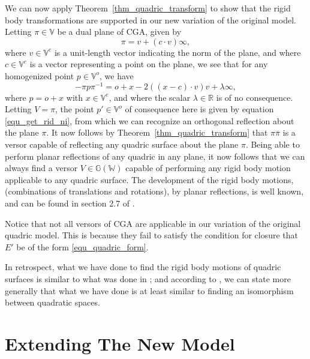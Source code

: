 \documentclass{birkjour}
\theoremstyle{definition}
\theoremstyle{remark}
\numberwithin{equation}{section}
\newcommand{\G}{\mathbb{G}}
\newcommand{\V}{\mathbb{V}}
\newcommand{\W}{\mathbb{W}}
\newcommand{\R}{\mathbb{R}}
\newcommand{\nvao}{o}
\newcommand{\nvai}{\infty}
\begin{document}
We can now apply Theorem~\ref{thm_quadric_transform} to show
that the rigid body transformations are supported in our new variation
of the original model.
Letting $\pi\in\V$ be a dual plane of CGA, given by
\begin{equation}
\pi = v+(c\cdot v)\nvai,
\end{equation}
where $v\in\V^e$ is a unit-length vector indicating the norm of the plane,
and where $c\in\V^e$ is a vector representing a point on the plane,
we see that for any homogenized point $p\in\V^o$, we have
\begin{equation}
-\pi p\pi^{-1} = \nvao+x-2((x-c)\cdot v)v + \lambda\nvai,
\end{equation}
where $p=\nvao+x$ with $x\in\V^e$, and
where the scalar $\lambda\in\R$ is of no consequence.  Letting $V=\pi$,
the point $p'\in\V^o$ of consequence here is given by equation \eqref{equ_get_rid_ni},
from which we can recognize an orthogonal reflection about the plane $\pi$.
It now follows by Theorem~\ref{thm_quadric_transform} that $\pi\overline{\pi}$ is a versor
capable of reflecting any quadric surface about the plane $\pi$.
Being able to perform planar reflections of any quadric in any plane, it
now follows that we can always find a versor $V\in\G(\W)$ capable of performing
any rigid body motion applicable to any quadric surface.  The development
of the rigid body motions, (combinations of translations and rotations), by planar reflections,
is well known, and can be found in section 2.7 of \cite{LiRockwood}.

Notice that not all versors of CGA are applicable in
our variation of the original quadric model.  This is because they fail to
satisfy the condition for closure that $E'$ be
of the form \eqref{equ_quadric_form}.

In retrospect, what we have done to find the rigid body motions
of quadric surfaces is similar to what was done in \cite{Langer08}; and
according to \cite{Pfister95}, we can state more generally that what we
have done is at least similar to finding an isomorphism between quadratic spaces.

\section{Extending The New Model}
\end{document}
